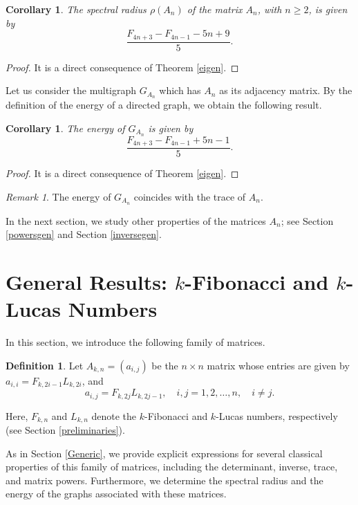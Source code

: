 \documentclass[11pt]{birkjour}
\newtheorem{cor}[thm]{Corollary}
\theoremstyle{definition}
\newtheorem{defin}[thm]{Definition}
\theoremstyle{remark}
\newtheorem{rem}[thm]{Remark}
\numberwithin{equation}{section}
\begin{document}
\begin{cor}
The spectral radius $\rho(A_n)$ of the matrix $A_n$, with $n\geq2$, is given by
\[
\frac{F_{4n + 3} - F_{4n - 1} - 5n + 9}{5}.
\]
\end{cor}

\begin{proof}
It is a direct consequence of Theorem \ref{eigen}.
\end{proof}

\noindent Let us consider the multigraph $G_{A_n}$ which has $A_n$ as its adjacency matrix. By the definition of the energy of a directed graph, we obtain the following result.

\begin{cor}
The energy of $G_{A_{n}}$ is given by
\[
\frac{F_{4n+3}-F_{4n-1}+5n-1}{5}.
\]
\end{cor}

\begin{proof}
It is a direct consequence of Theorem \ref{eigen}.
\end{proof}

\begin{rem}
The energy of $G_{A_{n}}$ coincides with the trace of $A_{n}$.
\end{rem}

\noindent In the next section, we study other properties of the matrices $A_n$; see Section \ref{powersgen} and Section \ref{inversegen}.


\section{General Results: $k$-Fibonacci and $k$-Lucas Numbers}\label{General}

In this section, we introduce the following family of matrices.

\begin{defin}
Let $A_{k,n}=\left(a_{i, j}\right)$ be the $n \times n$ matrix whose entries are given by $a_{i, i}=F_{k,2i-1} L_{k,2 i}$, and
\[
a_{i,j}=F_{k,2 j} L_{k,2j-1}, \quad i, j=1,2, \ldots, n, \quad i \neq j.
\]

\noindent Here, $F_{k,n}$ and $L_{k,n}$ denote the $k$-Fibonacci and $k$-Lucas numbers, respectively (see Section \ref{preliminaries}).
\end{defin}

\noindent As in Section \ref{Generic}, we provide explicit expressions for several classical properties of this family of matrices, including the determinant, inverse, trace, and matrix powers. Furthermore, we determine the spectral radius and the energy of the graphs associated with these matrices.
\end{document}

